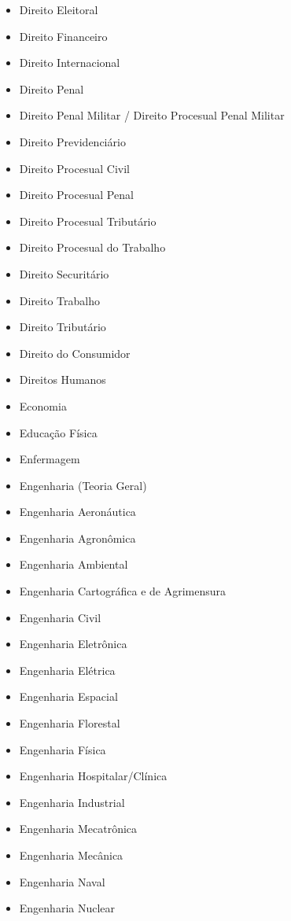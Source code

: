 \begin{multicols}{2}
\begin{itemize}
        \item Direito Eleitoral
        \item Direito Financeiro
        \item Direito Internacional
        \item Direito Penal
        \item Direito Penal Militar / Direito Procesual Penal Militar
        \item Direito Previdenciário
        \item Direito Procesual Civil
        \item Direito Procesual Penal
        \item Direito Procesual Tributário
        \item Direito Procesual do Trabalho
        \item Direito Securitário
        \item Direito Trabalho
        \item Direito Tributário
        \item Direito do Consumidor
        \item Direitos Humanos
        \item Economia
        \item Educação Física
        \item Enfermagem
        \item Engenharia (Teoria Geral)
        \item Engenharia Aeronáutica
        \item Engenharia Agronômica
        \item Engenharia Ambiental
        \item Engenharia Cartográfica e de Agrimensura
        \item Engenharia Civil
        \item Engenharia Eletrônica
        \item Engenharia Elétrica
        \item Engenharia Espacial
        \item Engenharia Florestal
        \item Engenharia Física
        \item Engenharia Hospitalar/Clínica
        \item Engenharia Industrial
        \item Engenharia Mecatrônica
        \item Engenharia Mecânica
        \item Engenharia Naval
        \item Engenharia Nuclear

\end{itemize}
\end{multicols}
